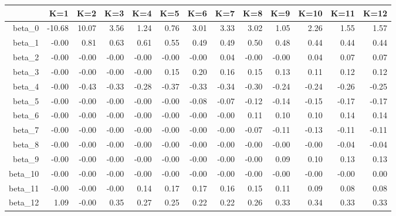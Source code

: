 \begin{table}[ht]
\centering
\begin{tabular}{rrrrrrrrrrrrr}
  \hline
 & K=1 & K=2 & K=3 & K=4 & K=5 & K=6 & K=7 & K=8 & K=9 & K=10 & K=11 & K=12 \\ 
  \hline
beta\_0 & -10.68 & 10.07 & 3.56 & 1.24 & 0.76 & 3.01 & 3.33 & 3.02 & 1.05 & 2.26 & 1.55 & 1.57 \\ 
  beta\_1 & -0.00 & 0.81 & 0.63 & 0.61 & 0.55 & 0.49 & 0.49 & 0.50 & 0.48 & 0.44 & 0.44 & 0.44 \\ 
  beta\_2 & -0.00 & -0.00 & -0.00 & -0.00 & -0.00 & -0.00 & 0.04 & -0.00 & -0.00 & 0.04 & 0.07 & 0.07 \\ 
  beta\_3 & -0.00 & -0.00 & -0.00 & -0.00 & 0.15 & 0.20 & 0.16 & 0.15 & 0.13 & 0.11 & 0.12 & 0.12 \\ 
  beta\_4 & -0.00 & -0.43 & -0.33 & -0.28 & -0.37 & -0.33 & -0.34 & -0.30 & -0.24 & -0.24 & -0.26 & -0.25 \\ 
  beta\_5 & -0.00 & -0.00 & -0.00 & -0.00 & -0.00 & -0.08 & -0.07 & -0.12 & -0.14 & -0.15 & -0.17 & -0.17 \\ 
  beta\_6 & -0.00 & -0.00 & -0.00 & -0.00 & -0.00 & -0.00 & -0.00 & 0.11 & 0.10 & 0.10 & 0.14 & 0.14 \\ 
  beta\_7 & -0.00 & -0.00 & -0.00 & -0.00 & -0.00 & -0.00 & -0.00 & -0.07 & -0.11 & -0.13 & -0.11 & -0.11 \\ 
  beta\_8 & -0.00 & -0.00 & -0.00 & -0.00 & -0.00 & -0.00 & -0.00 & -0.00 & -0.00 & -0.00 & -0.04 & -0.04 \\ 
  beta\_9 & -0.00 & -0.00 & -0.00 & -0.00 & -0.00 & -0.00 & -0.00 & -0.00 & 0.09 & 0.10 & 0.13 & 0.13 \\ 
  beta\_10 & -0.00 & -0.00 & -0.00 & -0.00 & -0.00 & -0.00 & -0.00 & -0.00 & -0.00 & -0.00 & -0.00 & 0.00 \\ 
  beta\_11 & -0.00 & -0.00 & -0.00 & 0.14 & 0.17 & 0.17 & 0.16 & 0.15 & 0.11 & 0.09 & 0.08 & 0.08 \\ 
  beta\_12 & 1.09 & -0.00 & 0.35 & 0.27 & 0.25 & 0.22 & 0.22 & 0.26 & 0.33 & 0.34 & 0.33 & 0.33 \\ 
   \hline
\end{tabular}
\end{table}
